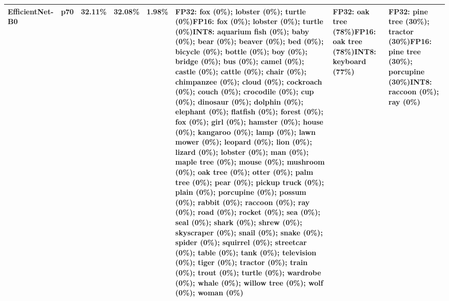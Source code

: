 \begin{longtable}{p{2.8cm} r r r r p{5.0cm} p{4.2cm} p{4.2cm}}
EfficientNet-B0 & p70 & 32.11\% & 32.08\% & 1.98\% & FP32: fox (0\%); lobster (0\%); turtle (0\%)\newline FP16: fox (0\%); lobster (0\%); turtle (0\%)\newline INT8: aquarium fish (0\%); baby (0\%); bear (0\%); beaver (0\%); bed (0\%); bicycle (0\%); bottle (0\%); boy (0\%); bridge (0\%); bus (0\%); camel (0\%); castle (0\%); cattle (0\%); chair (0\%); chimpanzee (0\%); cloud (0\%); cockroach (0\%); couch (0\%); crocodile (0\%); cup (0\%); dinosaur (0\%); dolphin (0\%); elephant (0\%); flatfish (0\%); forest (0\%); fox (0\%); girl (0\%); hamster (0\%); house (0\%); kangaroo (0\%); lamp (0\%); lawn mower (0\%); leopard (0\%); lion (0\%); lizard (0\%); lobster (0\%); man (0\%); maple tree (0\%); mouse (0\%); mushroom (0\%); oak tree (0\%); otter (0\%); palm tree (0\%); pear (0\%); pickup truck (0\%); plain (0\%); porcupine (0\%); possum (0\%); rabbit (0\%); raccoon (0\%); ray (0\%); road (0\%); rocket (0\%); sea (0\%); seal (0\%); shark (0\%); shrew (0\%); skyscraper (0\%); snail (0\%); snake (0\%); spider (0\%); squirrel (0\%); streetcar (0\%); table (0\%); tank (0\%); television (0\%); tiger (0\%); tractor (0\%); train (0\%); trout (0\%); turtle (0\%); wardrobe (0\%); whale (0\%); willow tree (0\%); wolf (0\%); woman (0\%) & FP32: oak tree (78\%)\newline FP16: oak tree (78\%)\newline INT8: keyboard (77\%) & FP32: pine tree (30\%); tractor (30\%)\newline FP16: pine tree (30\%); porcupine (30\%)\newline INT8: raccoon (0\%); ray (0\%) \\ \hline

\end{longtable}
